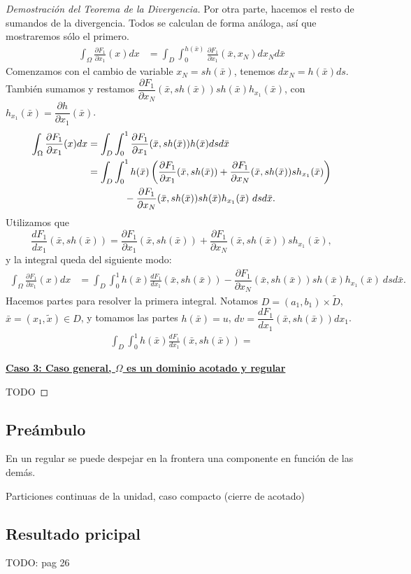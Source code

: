 \documentclass[12pt,spanish]{article}
\theoremstyle{definition}
\theoremstyle{remark}
\begin{document}
\begin{proof}[Demostración del Teorema de la Divergencia]
	Por otra parte, hacemos el resto de sumandos de la divergencia. Todos se calculan de forma análoga, así que mostraremos sólo el primero.
	\begin{align*}
	\int_\Omega\frac{\partial F_1}{\partial x_1}(x)dx&= \int_D\int_0^{h(\bar{x})}\frac{\partial F_1}{\partial x_1}(\bar{x},x_N)d x_N d\bar{x}
	\end{align*}
	Comenzamos con el cambio de variable $x_N=s h(\bar{x})$, tenemos $dx_N=h(\bar{x})ds$. También sumamos y restamos $\dfrac{\partial F_1}{\partial x_N}(\bar{x},sh(\bar{x}))sh(\bar{x})h_{x_1}(\bar{x})$, con $h_{x_1}(\bar{x})=\dfrac{\partial h}{\partial x_1}(\bar{x})$.
	\begin{align*}
	\int_\Omega\frac{\partial F_1}{\partial x_1}(x)dx&= \int_D\int_0^1\frac{\partial F_1}{\partial x_1}(\bar{x},s h(\bar{x})) h(\bar{x})ds d\bar{x} \\
	&=\int_D\int_0^1 h(\bar{x})\left(\frac{\partial F_1}{\partial x_1}(\bar{x},sh(\bar{x}))+\dfrac{\partial F_1}{\partial x_N}(\bar{x},sh(\bar{x}))sh_{x_1}(\bar{x})\right)\\
	&~\hspace{12mm}-\dfrac{\partial F_1}{\partial x_N}(\bar{x},sh(\bar{x}))sh(\bar{x})h_{x_1}(\bar{x}) \ dsd\bar{x}.
	\end{align*}
	Utilizamos que \[\frac{d F_1}{d x_1}(\bar{x},sh(\bar{x}))=\frac{\partial F_1}{\partial x_1}(\bar{x},sh(\bar{x}))+\dfrac{\partial F_1}{\partial x_N}(\bar{x},sh(\bar{x}))sh_{x_1}(\bar{x}),\]
	y la integral queda del siguiente modo:
	\begin{align*}
	\int_\Omega\frac{\partial F_1}{\partial x_1}(x)dx
	&=\int_D\int_0^1 h(\bar{x})\frac{d F_1}{d x_1}(\bar{x},sh(\bar{x}))-\dfrac{\partial F_1}{\partial x_N}(\bar{x},sh(\bar{x}))sh(\bar{x})h_{x_1}(\bar{x}) \ dsd\bar{x}.
	\end{align*}
	Hacemos partes para resolver la primera integral. Notamos $D=(a_1,b_1)\times \tilde{D}$, $\bar{x}=(x_1,\tilde{x})\in D$, y tomamos las partes $h(\bar{x})=u$, $dv=\dfrac{d F_1}{d x_1}(\bar{x},sh(\bar{x}))dx_1$.
	\begin{align*}
	\int_D\int_0^1 h(\bar{x})\frac{d F_1}{d x_1}(\bar{x},sh(\bar{x}))=
	\end{align*}
	
	\underline{\textbf{Caso 3: Caso general, $\Omega$ es un dominio acotado y regular}}
	
	TODO
	
\end{proof}

\subsection{Preámbulo}

En un regular se puede despejar en la frontera una componente en función de las demás.

Particiones continuas de la unidad, caso compacto (cierre de acotado)

\subsection{Resultado pricipal}

TODO: pag 26
\end{document}
